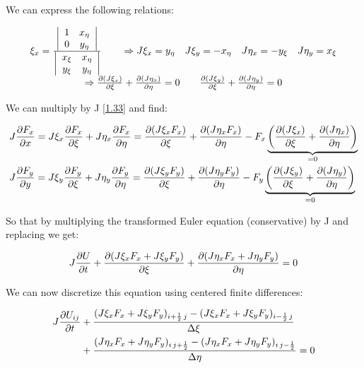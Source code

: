 We can express the following relations: 

\begin{equation}
\begin{array}{c}
\xi _x = \frac{\left| 
\begin{array}{cc}
1 & x_\eta\\
0 & y_\eta
\end{array}
\right|}{\left|
\begin{array}{cc}
x _\xi & x_\eta\\
y _\xi & y_\eta
\end{array}
\right|}
\qquad \Rightarrow J\xi _x = y_\eta \quad J\xi _y = -x_\eta \quad J\eta _x = -y_\xi \quad J\eta _y = x_\xi
\\
\Rightarrow \frac{\partial (J\xi _x)}{\partial \xi} + \frac{\partial (J\eta_x)}{\partial \eta} = 0 \qquad \frac{\partial (J\xi _y)}{\partial \xi} + \frac{\partial (J\eta_y)}{\partial \eta} = 0
\end{array}
\end{equation}

We can multiply by J \eqref{1.33} and find: 

\begin{equation}
\begin{aligned}
&J\frac{\partial F_x}{\partial x} = J\xi _x\frac{\partial F_x}{\partial \xi} + J\eta _x\frac{\partial F_x}{\partial \eta} = \frac{\partial (J\xi _x F_x)}{\partial \xi} + \frac{\partial (J\eta _xF_x)}{\partial \eta} - F_x\underbrace{ \left( \frac{\partial (J\xi _x)}{\partial \xi} + \frac{\partial (J\eta _x)}{\partial \eta} \right)}_{=0}
\\
&J\frac{\partial F_y}{\partial y} = J\xi _y\frac{\partial F_y}{\partial \xi} + J\eta _y\frac{\partial F_y}{\partial \eta} = \frac{\partial (J\xi _y F_y)}{\partial \xi} + \frac{\partial (J\eta _yF_y)}{\partial \eta} - F_y\underbrace{ \left( \frac{\partial (J\xi _y)}{\partial \xi} + \frac{\partial (J\eta _y)}{\partial \eta} \right)}_{=0}
\end{aligned}
\end{equation}

So that by multiplying the transformed Euler equation (conservative) by J and replacing we get: 

\begin{equation}
J\frac{\partial U}{\partial t} + \frac{\partial (J\xi _x F_x + J\xi _y F_y)}{\partial \xi} + \frac{\partial (J\eta _xF_x + J\eta _yF_y)}{\partial \eta} = 0
\end{equation}

We can now discretize this equation using centered finite differences: 

\begin{equation}
\begin{aligned}
J\frac{\partial U_{ij}}{\partial t} &+ \frac{(J\xi _x F_x + J\xi _y F_y)_{i+\frac{1}{2}\, j}-(J\xi _x F_x + J\xi _y F_y)_{i-\frac{1}{2}\, j}}{\Delta \xi}\\ 
&+ \frac{(J\eta _xF_x + J\eta _yF_y)_{i\, j+\frac{1}{2}} - (J\eta _xF_x + J\eta _yF_y)_{i\, j-\frac{1}{2}}}{\Delta \eta} = 0
\end{aligned}
\end{equation}

